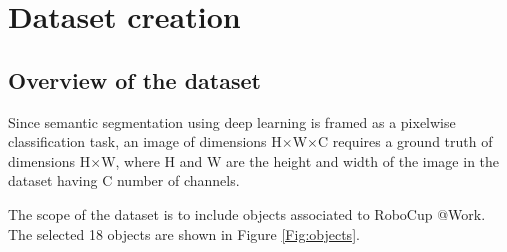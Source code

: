 
\chapter{Dataset creation}

\section{Overview of the dataset}
Since semantic segmentation using deep learning is framed as a pixelwise classification task, an image of dimensions H$\times$W$\times$C requires a ground truth of dimensions H$\times$W, where H and W are the height and width of the image in the dataset having C number of channels. 

The scope of the dataset is to include objects associated to RoboCup @Work. The selected 18 objects are shown in Figure \ref{Fig:objects}.

